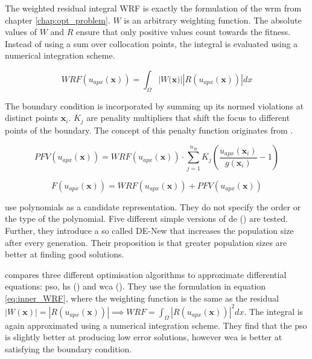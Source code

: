 \documentclass[./\jobname.tex]{subfiles}
\begin{document}
The weighted residual integral WRF is exactly the formulation of the \gls{wrm} from chapter \ref{chap:opt_problem}. $W$ is an arbitrary weighting function. The absolute values of $W$ and $R$ ensure that only positive values count towards the fitness. Instead of using a sum over collocation points, the integral is evaluated using a numerical integration scheme.

\begin{equation}
\label{eq:inner_WRF}
WRF(u_{apx}(\mathbf{x})) = \int_{\Omega} |W(\mathbf{x)}| |R(u_{apx}(\mathbf{x}))| dx
\end{equation} 

The boundary condition is incorporated by summing up its normed violations at distinct points $\mathbf{x}_i$. $K_j$ are penality multipliers that shift the focus to different points of the boundary. The concept of this penalty function originates from \cite{rajeev_s_discrete_1992}.

\begin{equation}
\label{eq:boundary_penalty}
PFV(u_{apx}(\mathbf{x})) = WRF(u_{apx}(\mathbf{x})) \cdot \sum_{j=1}^{n_B} K_j \left(\frac{u_{apx}(\mathbf{x}_i)}{g(\mathbf{x}_i)} - 1\right)
\end{equation}

\begin{equation}
\label{eq:inner_and_boundary_fitness}
F(u_{apx}(\mathbf{x})) = WRF(u_{apx}(\mathbf{x})) + PFV(u_{apx}(\mathbf{x}))
\end{equation}

\cite{panagant_solving_2014} use polynomials as a candidate representation. They do not specify the order or the type of the polynomial. Five different simple versions of \gls{de} (\cite{storn_differential_1997}) are tested. Further, they introduce a so called DE-New that increases the population size after every generation. Their proposition is that greater population sizes are better at finding good solutions. 

\cite{sadollah_metaheuristic_2017} compares three different optimisation algorithms to approximate differential equations: \gls{pso}, \gls{hs} (\cite{geem_new_2001}) and \gls{wca} (\cite{eskandar_water_2012}). They use the formulation in equation \eqref{eq:inner_WRF}, where the weighting function is the same as the residual $|W(\mathbf{x})| = |R(u_{apx}(\mathbf{x}))| \implies WRF = \int_{\Omega} |R(u_{apx}(\mathbf{x}))|^2 dx$. The integral is again approximated using a numerical integration scheme. They find that the \gls{pso} is slightly better at producing low error solutions, however \gls{wca} is better at satisfying the boundary condition. 
\end{document}
